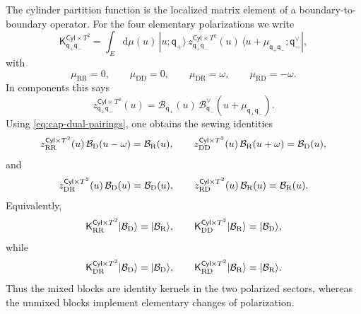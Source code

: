 \documentclass[11pt,a4paper]{article}
\numberwithin{equation}{section}
\theoremstyle{plain}
\theoremstyle{definition}
\theoremstyle{remark}
\newcommand{\cyl}{\mathsf{Cyl}}
\begin{document}
The cylinder partition function is the localized matrix element of a boundary-to-boundary operator.  For the four elementary polarizations we write
\begin{equation}
\mathsf K_{\mathsf q_+\mathsf q_-}^{\cyl\times T^2}
=
\int_E \mathrm d\mu(u)\,
|u;\mathsf q_+\rangle\,
z_{\mathsf q_+\mathsf q_-}^{\cyl\times T^2}(u)\,
\langle u+\mu_{\mathsf q_+\mathsf q_-};\mathsf q_-^{\vee}|,
\label{eq:cyl-kernel-operator}
\end{equation}
with
\begin{equation}
\mu_{\mathrm{RR}}=0,
\qquad
\mu_{\mathrm{DD}}=0,
\qquad
\mu_{\mathrm{DR}}=\omega,
\qquad
\mu_{\mathrm{RD}}=-\omega.
\label{eq:cyl-kernel-shifts}
\end{equation}
In components this says
\begin{equation}
z_{\mathsf q_+\mathsf q_-}^{\cyl\times T^2}(u)
=
\mathcal B_{\mathsf q_+}(u)\,
\mathcal B_{\mathsf q_-}^{\vee}\!\left(u+\mu_{\mathsf q_+\mathsf q_-}\right).
\label{eq:cyl-kernel-components-halfblocks}
\end{equation}
Using \eqref{eq:cap-dual-pairings}, one obtains the sewing identities
\begin{equation}
z_{\rm RR}^{\cyl\times T^2}(u)\,\mathcal B_{\mathrm D}(u-\omega)
=
\mathcal B_{\mathrm R}(u),
\qquad
z_{\rm DD}^{\cyl\times T^2}(u)\,\mathcal B_{\mathrm R}(u+\omega)
=
\mathcal B_{\mathrm D}(u),
\label{eq:cyl-kernel-changing-polarization}
\end{equation}
and
\begin{equation}
z_{\rm DR}^{\cyl\times T^2}(u)\,\mathcal B_{\mathrm D}(u)
=
\mathcal B_{\mathrm D}(u),
\qquad
z_{\rm RD}^{\cyl\times T^2}(u)\,\mathcal B_{\mathrm R}(u)
=
\mathcal B_{\mathrm R}(u).
\label{eq:cyl-kernel-identity-polarization}
\end{equation}
Equivalently,
\begin{equation}
\mathsf K_{\rm RR}^{\cyl\times T^2}|\mathcal B_{\mathrm D}\rangle
=
|\mathcal B_{\mathrm R}\rangle,
\qquad
\mathsf K_{\rm DD}^{\cyl\times T^2}|\mathcal B_{\mathrm R}\rangle
=
|\mathcal B_{\mathrm D}\rangle,
\label{eq:cyl-kernel-operator-changing-polarization}
\end{equation}
while
\begin{equation}
\mathsf K_{\rm DR}^{\cyl\times T^2}|\mathcal B_{\mathrm D}\rangle
=
|\mathcal B_{\mathrm D}\rangle,
\qquad
\mathsf K_{\rm RD}^{\cyl\times T^2}|\mathcal B_{\mathrm R}\rangle
=
|\mathcal B_{\mathrm R}\rangle.
\label{eq:cyl-kernel-operator-identity-polarization}
\end{equation}
Thus the mixed blocks are identity kernels in the two polarized sectors, whereas the unmixed blocks implement elementary changes of polarization.
\end{document}
